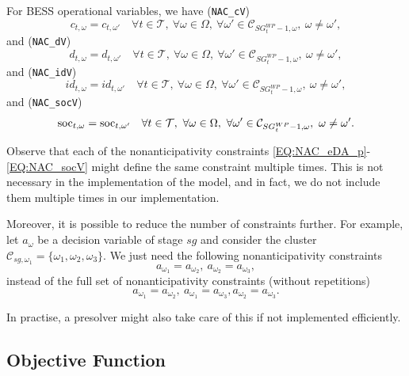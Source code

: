 For BESS operational variables, we have (\verb|NAC_cV|)
\begin{equation} \label{EQ:NAC_cV}
	c_{t, \omega} = c_{t, \omega'} \quad \forall t \in \mathcal{T}, \ \forall \omega \in \Omega, \ \forall \omega' \in \mathcal{C}_{SG^{WP}_t - 1, \omega}, \ \omega \neq \omega',
\end{equation}
and (\verb|NAC_dV|)
\begin{equation} \label{EQ:NAC_dV}
	d_{t, \omega} = d_{t, \omega'} \quad \forall t \in \mathcal{T}, \ \forall \omega \in \Omega, \ \forall \omega' \in \mathcal{C}_{SG^{WP}_t - 1, \omega}, \ \omega \neq \omega',
\end{equation}
and (\verb|NAC_idV|)
\begin{equation} \label{EQ:NAC_idV}
	id_{t, \omega} = id_{t, \omega'} \quad \forall t \in \mathcal{T}, \ \forall \omega \in \Omega, \ \forall \omega' \in \mathcal{C}_{SG^{WP}_t - 1, \omega}, \ \omega \neq \omega',
\end{equation}
and (\verb|NAC_socV|)
\begin{equation} \label{EQ:NAC_socV}
	\text{soc}_{t, \omega} = \text{soc}_{t, \omega'} \quad \forall t \in \mathcal{T}, \ \forall \omega \in \Omega, \ \forall \omega' \in \mathcal{C}_{SG^{WP}_t - 1, \omega}, \ \omega \neq \omega'.
\end{equation}

\begin{note}
Observe that each of the nonanticipativity constraints \eqref{EQ:NAC_eDA_p}-\eqref{EQ:NAC_socV} might define the same constraint multiple times. This is not necessary in the implementation of the model, and in fact, we do not include them multiple times in our implementation.
	
Moreover, it is possible to reduce the number of constraints further. For example, let $a_{\omega}$ be a decision variable of stage $sg$ and consider the cluster $\mathcal{C}_{sg, \omega_1} = \{ \omega_1, \omega_2, \omega_3 \}$. We just need the following nonanticipativity constraints 
$$
a_{\omega_1} = a_{\omega_2}, \ a_{\omega_2} = a_{\omega_3},
$$
instead of the full set of nonanticipativity constraints (without repetitions)
$$
a_{\omega_1} = a_{\omega_2}, \ a_{\omega_1} = a_{\omega_3}, a_{\omega_2} = a_{\omega_3}.
$$

In practise, a presolver might also take care of this if not implemented efficiently.	
\end{note}


\subsection{Objective Function}
\label{SEC:ObjectiveFunction}

